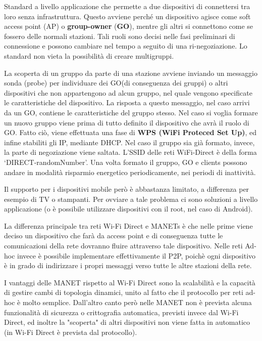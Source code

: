 Standard a livello applicazione che permette a due dispositivi di connettersi 
tra loro senza infrastruttura. Questo avviene perché un dispositivo agisce come 
soft access point (AP) o \textbf{group-owner} (\textbf{GO}), mentre gli altri si 
connettono come se fossero delle normali stazioni. Tali ruoli sono decisi nelle 
fasi preliminari di connessione e possono cambiare nel tempo a seguito di una 
ri-negoziazione. Lo standard non vieta la possibilità di creare multigruppi.

La scoperta di un gruppo da parte di una stazione avviene inviando un messaggio 
sonda (probe) per individuare dei GO(di conseguenza dei gruppi) o altri 
dispositivi che non appartengono ad alcun gruppo, nel quale vengono specificate 
le caratteristiche del dispositivo. La risposta a questo messaggio, nel caso 
arrivi da un GO, contiene le caratteristiche del gruppo stesso. Nel caso si 
voglia formare un nuovo gruppo viene prima di tutto definito il dispositivo
che avrà il ruolo di GO. Fatto ciò, viene effettuata una fase di 
\textbf{WPS (WiFi Proteced Set Up)}, ed infine stabiliti gli IP, mediante DHCP. 
Nel caso il gruppo sia già formato, invece, la parte di negoziazione viene 
saltata. L'SSID delle reti WiFi-Direct è della forma `DIRECT-randomNumber'.
Una volta formato il gruppo, GO e clients possono andare in modalità risparmio energetico 
periodicamente, nei periodi di inattività.

Il supporto per i dispositivi mobile però è abbastanza limitato, a differenza per 
esempio di TV o stampanti. Per ovviare a tale problema ci sono soluzioni a 
livello applicazione (o è possibile utilizzare dispositivi con il root, nel caso 
di Android).

La differenza principale tra reti Wi-Fi Direct e MANETs è che nelle prime 
viene deciso un dispositivo che farà da access point e di conseguenza tutte le 
comunicazioni della rete dovranno fluire attraverso tale dispositivo. Nelle reti
Ad-hoc invece è possibile implementare effettivamente il P2P, poichè ogni 
dispositivo è in grado di indirizzare i propri messaggi verso tutte le altre 
stazioni della rete.

I vantaggi delle MANET rispetto al Wi-Fi Direct sono la scalabilità e la 
capacità di gestire cambi di topologia dinamici, unito al fatto che il 
protocollo per reti ad-hoc è molto semplice. Dall'altro canto però nelle MANET 
non è prevista alcuna funzionalità di sicurezza o crittografia automatica, 
previsti invece dal Wi-Fi Direct, ed inoltre la "scoperta" di altri dispositivi
non viene fatta in automatico (in Wi-Fi Direct è prevista dal protocollo).

